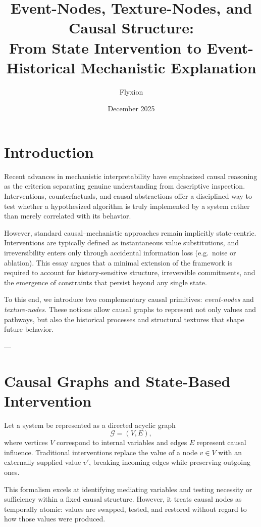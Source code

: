 \documentclass[11pt]{article}
\title{Event-Nodes, Texture-Nodes, and Causal Structure:\\
From State Intervention to Event-Historical Mechanistic Explanation}
\author{Flyxion}
\date{December 2025}
\newcommand{\Graph}{\mathcal{G}}
\begin{document}
\maketitle

\section{Introduction}

Recent advances in mechanistic interpretability have emphasized causal reasoning as the criterion separating genuine understanding from descriptive inspection. Interventions, counterfactuals, and causal abstractions offer a disciplined way to test whether a hypothesized algorithm is truly implemented by a system rather than merely correlated with its behavior.

However, standard causal–mechanistic approaches remain implicitly state-centric. Interventions are typically defined as instantaneous value substitutions, and irreversibility enters only through accidental information loss (e.g.\ noise or ablation). This essay argues that a minimal extension of the framework is required to account for history-sensitive structure, irreversible commitments, and the emergence of constraints that persist beyond any single state.

To this end, we introduce two complementary causal primitives:
\emph{event-nodes} and \emph{texture-nodes}. These notions allow causal graphs to represent not only values and pathways, but also the historical processes and structural textures that shape future behavior.

---

\section{Causal Graphs and State-Based Intervention}

Let a system be represented as a directed acyclic graph
\[
\Graph = (V, E),
\]
where vertices $V$ correspond to internal variables and edges $E$ represent causal influence. Traditional interventions replace the value of a node $v \in V$ with an externally supplied value $v'$, breaking incoming edges while preserving outgoing ones.

This formalism excels at identifying mediating variables and testing necessity or sufficiency within a fixed causal structure. However, it treats causal nodes as temporally atomic: values are swapped, tested, and restored without regard to how those values were produced.
\end{document}
